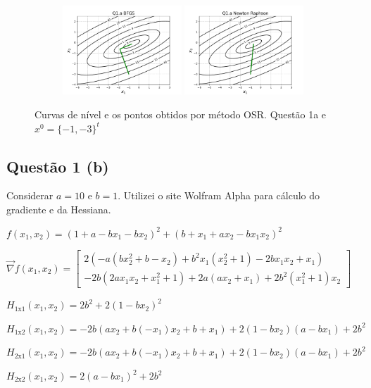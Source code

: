 \documentclass[10pt, a4paper]{article}
\begin{document}
\begin{figure}[H]
\begin{subfigure}[b]{\textwidth}
  \end{subfigure}
  \begin{subfigure}[b]{\textwidth}
    \includegraphics[width=0.49\textwidth]{figuras/Q1.a_BFGS_P0=[-1 -3].pdf}
    \includegraphics[width=0.49\textwidth]{figuras/Q1.a_Newton Raphson_P0=[-1 -3].pdf}
  \end{subfigure}
  \caption{Curvas de nível e os pontos obtidos por método OSR. Questão 1a e $x^0 = \{-1,-3\}^t$}
\end{figure}

\subsection{Questão 1 (b)}
Considerar $a = 10$ e $b = 1$. Utilizei o site Wolfram Alpha para cálculo do gradiente e da Hessiana.

\vspace{5mm}

\begin{center}
$f(x_1,x_2) = (1 + a -bx_1 - bx_2)^2 + (b + x_1 + ax_2 - bx_1x_2)^2$

\vspace{5mm}
$\overrightarrow{\nabla} f(x_1,x_2) = 
\begin{bmatrix}
  2(-a(bx_2^2 + b - x_2) + b^2x_1(x_2^2 + 1) -2bx_1x_2 + x_1) \\ -2b(2ax_1x_2 + x_1^2 + 1) + 2a(ax_2 + x_1) + 2b^2(x_1^2 +1)x_2
\end{bmatrix}$

\vspace{5mm}

$H_{1\text{x}1}(x_1,x_2) = 2b^2 + 2(1 - bx_2)^2$

$H_{1\text{x}2}(x_1,x_2) = -2b(ax_2 + b(-x_1)x_2 + b + x_1) + 2(1 - bx_2)(a - bx_1) + 2 b^2$

$H_{2\text{x}1}(x_1,x_2) = -2b(ax_2 + b(-x_1)x_2 + b + x_1) + 2(1 - bx_2) (a - bx_1) + 2 b^2$

$H_{2\text{x}2}(x_1,x_2) = 2(a - bx_1)^2 + 2b^2$

\end{center}
\end{document}
